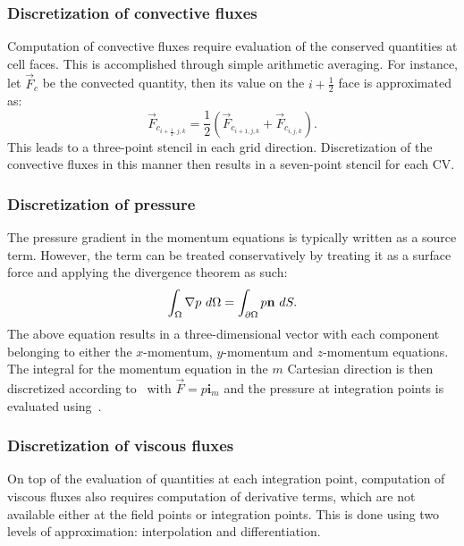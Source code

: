\subsubsection{Discretization of convective fluxes}
%
Computation of convective fluxes require evaluation of the conserved quantities at cell faces. This is accomplished through simple arithmetic averaging. For instance, let $\vec{F}_c$ be the convected quantity, then its value on the $i+\frac{1}{2}$ face is approximated as:
\begin{equation}
    \vec{F}_{c_{i+\frac{1}{2},j,k}} = \frac{1}{2}\left(
        \vec{F}_{c_{i+1,j,k}} + \vec{F}_{c_{i,j,k}}
    \right)
    \label{eq:synavg}.
\end{equation}
This leads to a three-point stencil in each grid direction. Discretization of the convective fluxes in this manner then results in a seven-point stencil for each CV.
%
\subsubsection{Discretization of pressure}
%
The pressure gradient in the momentum equations is typically written as a source term. However, the term can be treated conservatively by treating it as a surface force and applying the divergence theorem as such:
\begin{equation*}
    \int_\Omega \nabla p~d\Omega = \int_{\partial \Omega} p\mathbf{n}~dS.
\end{equation*}
The above equation results in a three-dimensional vector with each component belonging to either the $x$-momentum, $y$-momentum and $z$-momentum equations. The integral for the momentum equation in the $m$ Cartesian direction is then discretized according to~ with $\vec{F} = p \boldsymbol{i}_m$ and the pressure at integration points is evaluated using~.
%
\subsubsection{Discretization of viscous fluxes}
%
On top of the evaluation of quantities at each integration point, computation of viscous fluxes also requires computation of derivative terms, which are not available either at the field points or integration points. This is done using two levels of approximation: interpolation and differentiation.

